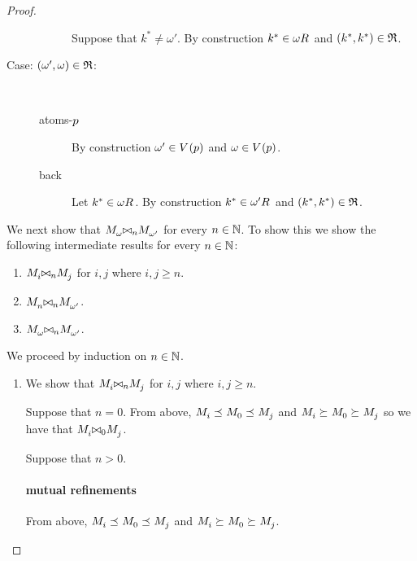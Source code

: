 \begin{proof}
\begin{description}
\begin{description}
                Suppose that $k^* \neq \omega'$.
                By construction $k^* \in \kSuccessors{}{\omega}$ and $(k^*, k^*) \in \mathfrak{R}$.
        \end{description}
    \item[Case: $(\omega', \omega) \in \mathfrak{R}$:]\hfill\\
        \begin{description}
            \item[atoms-$p$]
                By construction $\omega' \in \kValuation(\atomP)$ and $\omega \in \kValuation(\atomP)$.
            \item[back]
                Let $k^* \in \kSuccessors{}{\omega}$.
                By construction $k^* \in \kSuccessors{}{\omega'}$ and $(k^*, k^*) \in \mathfrak{R}$.
        \end{description}
\end{description}

We next show that $\kPModel{\omega} \bisimref[n] \kPModel{\omega'}$ for every $n \in \mathbb{N}$. 
To show this we show the following intermediate results for every $n \in \mathbb{N}$:
\begin{enumerate}
    \item $\kPModel{i} \bisimref[n] \kPModel{j}$ for $i, j$ where $i, j \geq n$.
    \item $\kPModel{n} \bisimref[n] \kPModel{\omega'}$.
    \item $\kPModel{\omega} \bisimref[n] \kPModel{\omega'}$.
\end{enumerate}

We proceed by induction on $n \in \mathbb{N}$.

\begin{enumerate}
    \item We show that $\kPModel{i} \bisimref[n] \kPModel{j}$ for $i, j$ where $i, j \geq n$.

    Suppose that $n = 0$. 
    From above, $\kPModel{i} \refines \kPModel{0} \refines \kPModel{j}$ and $\kPModel{i} \simulates \kPModel{0} \simulates \kPModel{j}$ so we have that $\kPModel{i} \bisimref[0] \kPModel{j}$.

    Suppose that $n > 0$.

    \paragraph{mutual refinements}

    From above, $\kPModel{i} \refines \kPModel{0} \refines \kPModel{j}$
    and $\kPModel{i} \simulates \kPModel{0} \simulates \kPModel{j}$.


\end{enumerate}
\end{proof}
